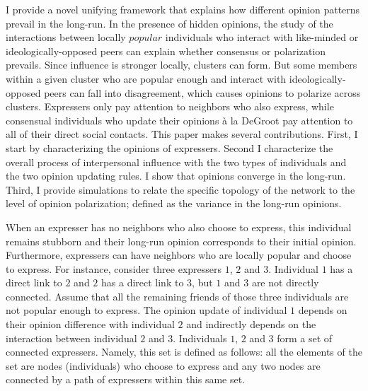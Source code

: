 \documentclass{article}
\begin{document}
I provide a novel unifying framework that explains how different opinion patterns prevail in the long-run. In the presence of hidden opinions, the study of the interactions between locally $popular$ individuals who interact with like-minded or ideologically-opposed peers can explain whether consensus or polarization prevails. Since influence is stronger locally, clusters can form. But some members within a given cluster who are popular enough and interact with ideologically-opposed peers can fall into disagreement, which causes opinions to polarize across clusters. Expressers only pay attention to neighbors who also express, while consensual individuals who update their opinions \`{a} la DeGroot pay attention to all of their direct social contacts. This paper makes several contributions. First, I start by characterizing the opinions of expressers. Second I characterize the overall process of interpersonal influence with the two types of individuals and the two opinion updating rules. I show that opinions converge in the long-run. Third, I provide simulations to relate the specific topology of the network to the level of opinion polarization; defined as the variance in the long-run opinions. 

\bigskip

When an expresser has no neighbors who also choose to express, this individual remains stubborn and their long-run opinion corresponds to their initial opinion. Furthermore, expressers can have neighbors who are locally popular and choose to express. For instance, consider three expressers $1$, $2$ and $3$. Individual $1$ has a direct link to $2$ and $2$ has a direct link to $3$, but $1$ and $3$ are not directly connected. Assume that all the remaining friends of those three individuals are not popular enough to express. The opinion update of individual $1$ depends on their opinion difference with individual $2$ and indirectly depends on the interaction between individual $2$ and $3$. Individuals $1$, $2$ and $3$ form a set of connected expressers. Namely, this set is defined as follows: all the elements of the set are nodes (individuals) who choose to express and any two nodes are connected by a path of expressers within this same set. 
\end{document}
